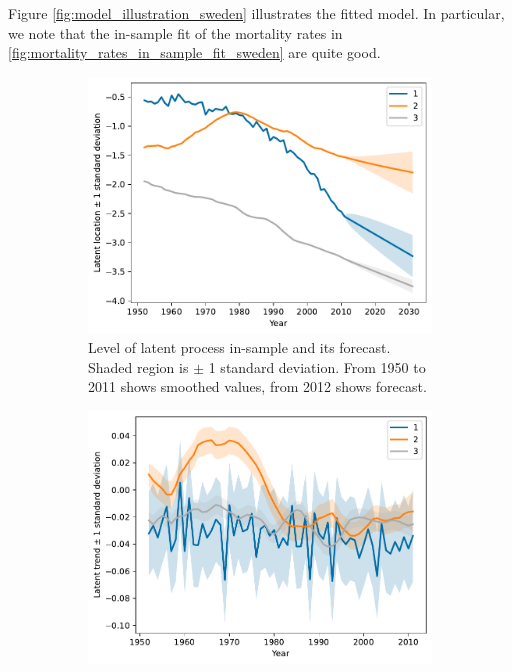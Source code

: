 \documentclass[preprint,12pt]{elsarticle}
\begin{document}
Figure \ref{fig:model_illustration_sweden} illustrates the fitted model. In particular, we note that the in-sample fit of the mortality rates in \ref{fig:mortality_rates_in_sample_fit_sweden} are quite good.
\begin{figure}
    \centering    \begin{subfigure}[b]{0.45\textwidth}
        \centering
        \includegraphics[width=\textwidth]{figs/sweden_1952_2011_Male_100_1_3latent_forecast.pdf}
        \caption{Level of latent process in-sample and its forecast. Shaded region is $\pm$ 1 standard deviation. From 1950 to 2011 shows smoothed values, from 2012 shows forecast.}
    \end{subfigure}
    \hfill
    \begin{subfigure}[b]{0.45\textwidth}
        \centering
        \includegraphics[width=\textwidth]{figs/sweden_1952_2011_Male_100_1_3latent_trend.pdf}

\end{subfigure}
\end{figure}
\end{document}
